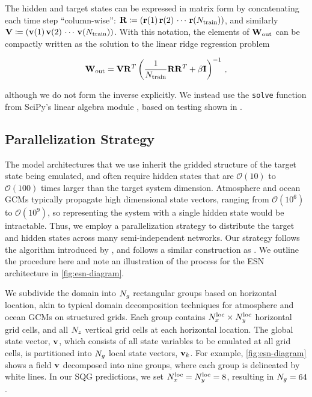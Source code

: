 The hidden and target states can be expressed in matrix form by concatenating
each time step ``column-wise'':
$\mathbf{R} \coloneqq (\mathbf{r}(1) \, \mathbf{r}(2) \, \cdots \, \mathbf{r}(N_\text{train}))$,
and similarly\\
\noindent$\mathbf{V} \coloneqq (\mathbf{v}(1) \, \mathbf{v}(2) \, \cdots \, \mathbf{v}(N_\text{train}))$.
With this notation, the elements of $\mathbf{W}_\text{out}$ can be compactly written as the
solution to the linear ridge regression problem
\begin{linenomath*}\begin{equation}
    \mathbf{W}_\text{out} = \mathbf{V} \mathbf{R}^T \left(\dfrac{1}{N_\text{train}}\mathbf{R}\mathbf{R}^T +
    \beta\mathbf{I}\right)^{-1} \, ,
    \label{eq:ridge_regression}
\end{equation}\end{linenomath*}
although we do not form the inverse explicitly.
We instead use the \texttt{solve} function from SciPy's linear algebra module
\citep{scipy_2020}, based on testing shown in
\citet<Appendix C of>[]{platt_systematic_2022}.


\subsection{Parallelization Strategy}
\label{subsec:parallelization}

The model architectures that we use inherit the gridded structure of the target
state being emulated, and often require hidden states that are
$\mathcal{O}(10)$ to $\mathcal{O}(100)$ times larger than the target system dimension.
Atmosphere and ocean GCMs typically propagate high dimensional state vectors, ranging from $\mathcal{O}(10^6)$ to $\mathcal{O}(10^9)$,
so representing the system with a single hidden state would be intractable.
Thus, we employ a parallelization strategy to distribute the target and hidden
states across many semi-independent networks.
Our strategy follows the algorithm introduced by \citet{pathak_model-free_2018},
and follows a similar construction as \citet{arcomano_machine_2020}.
We outline the procedure here and note an illustration of the process for
the ESN architecture in \cref{fig:esn-diagram}.

We subdivide the domain into $N_{g}$ rectangular groups based on horizontal location,
akin to typical domain decomposition techniques for atmosphere and ocean
GCMs on structured grids.
Each group contains
$N_{x}^\text{loc}\times N_{y}^\text{loc}$ horizontal grid cells, and all $N_{z}$
vertical grid cells at each horizontal location.
The global state vector, $\mathbf{v}$, which consists of all state variables to be
emulated at all grid cells, is partitioned into $N_{g}$ local state vectors,
$\mathbf{v}_{k}$.
For example, \cref{fig:esn-diagram} shows a field $\mathbf{v}$ decomposed into nine
groups, where each group is delineated by white lines.
In our SQG predictions, we set $N_{x}^\text{loc} = N_{y}^\text{loc} = 8$, resulting in
$N_{g}=64$.

